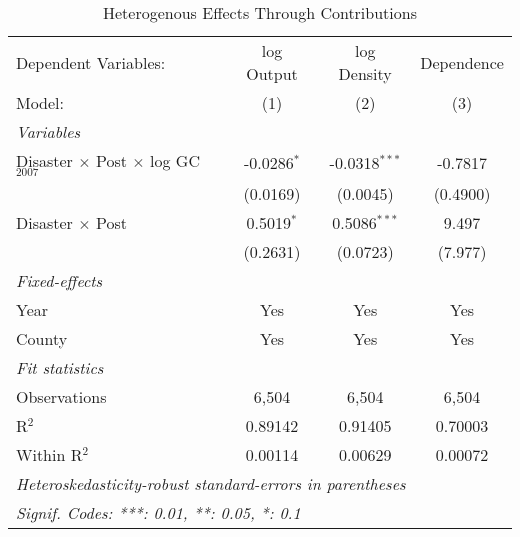 
\begin{table}[htbp]
   \caption{Heterogenous Effects Through Contributions}
   \centering
   \begin{adjustbox}{max width = \textwidth, center}
      \begin{tabular}{lccc}
         \tabularnewline \midrule \midrule
         Dependent Variables:                              & log Output    & log Density     & Dependence\\  
         Model:                                            & (1)           & (2)             & (3)\\  
         \midrule
         \emph{Variables}\\
         Disaster $\times$ Post $\times$ log GC$_{2007}$   & -0.0286$^{*}$ & -0.0318$^{***}$ & -0.7817\\   
                                                           & (0.0169)      & (0.0045)        & (0.4900)\\   
         Disaster $\times$ Post                            & 0.5019$^{*}$  & 0.5086$^{***}$  & 9.497\\   
                                                           & (0.2631)      & (0.0723)        & (7.977)\\   
         \midrule
         \emph{Fixed-effects}\\
         Year                                              & Yes           & Yes             & Yes\\  
         County                                            & Yes           & Yes             & Yes\\  
         \midrule
         \emph{Fit statistics}\\
         Observations                                      & 6,504         & 6,504           & 6,504\\  
         R$^2$                                             & 0.89142       & 0.91405         & 0.70003\\  
         Within R$^2$                                      & 0.00114       & 0.00629         & 0.00072\\  
         \midrule \midrule
         \multicolumn{4}{l}{\emph{Heteroskedasticity-robust standard-errors in parentheses}}\\
         \multicolumn{4}{l}{\emph{Signif. Codes: ***: 0.01, **: 0.05, *: 0.1}}\\
      \end{tabular}
   \end{adjustbox}
\end{table}


